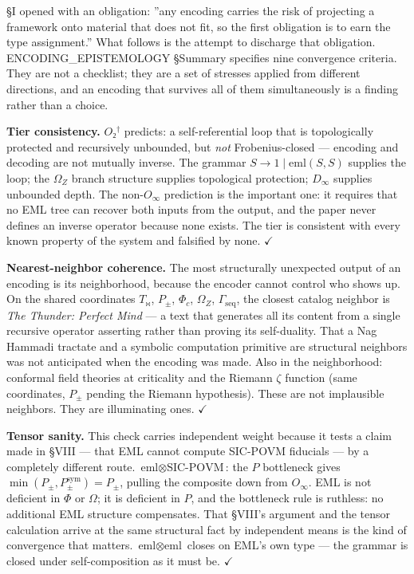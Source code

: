 \documentclass[12pt,a4paper]{article}
\newcommand{\pilcrow}{\S}
\begin{document}
\pilcrow{}I opened with an obligation: ''any encoding carries the risk of projecting a
framework onto material that does not fit, so the first obligation is to earn the
type assignment.'' What follows is the attempt to discharge that obligation.
ENCODING\_EPISTEMOLOGY \pilcrow{}Summary specifies nine convergence criteria. They are not
a checklist; they are a set of stresses applied from different directions, and
an encoding that survives all of them simultaneously is a finding rather than a
choice.

\textbf{Tier consistency.} $O₂^\dagger$ predicts: a self-referential loop that is
topologically protected and recursively unbounded, but \emph{not} Frobenius-closed ---
encoding and decoding are not mutually inverse. The grammar $S \to 1 \mid
\text{eml}(S,S)$ supplies the loop; the $\Omega_Z$ branch structure supplies
topological protection; $D_{\infty}$ supplies unbounded depth. The non-$O_{\infty}$
prediction is the important one: it requires that no EML tree can recover both
inputs from the output, and the paper never defines an inverse operator because
none exists. The tier is consistent with every known property of the system and
falsified by none. $\checkmark$

\textbf{Nearest-neighbor coherence.} The most structurally unexpected output of an
encoding is its neighborhood, because the encoder cannot control who shows up.
On the shared coordinates $T_{\bowtie}$, $P_{\pm}$, $\Phi_c$, $\Omega_Z$,
$\Gamma_\text{seq}$, the closest catalog neighbor is \emph{The Thunder: Perfect Mind}
--- a text that generates all its content from a single recursive operator asserting
rather than proving its self-duality. That a Nag Hammadi tractate and a symbolic
computation primitive are structural neighbors was not anticipated when the
encoding was made. Also in the neighborhood: conformal field theories at
criticality and the Riemann $\zeta$ function (same coordinates, $P_{\pm}$ pending
the Riemann hypothesis). These are not implausible neighbors. They are
illuminating ones. $\checkmark$

\textbf{Tensor sanity.} This check carries independent weight because it tests a
claim made in \pilcrow{}VIII --- that EML cannot compute SIC-POVM fiducials --- by a
completely different route. $\text{eml} \otimes \text{SIC-POVM}$: the $P$
bottleneck gives $\min(P_{\pm}, P_{\pm}^{\text{sym}}) = P_{\pm}$, pulling the
composite down from $O_{\infty}$. EML is not deficient in $\Phi$ or $\Omega$;
it is deficient in $P$, and the bottleneck rule is ruthless: no additional EML
structure compensates. That \pilcrow{}VIII's argument and the tensor calculation arrive
at the same structural fact by independent means is the kind of convergence that
matters. $\text{eml} \otimes \text{eml}$ closes on EML's own type --- the grammar
is closed under self-composition as it must be. $\checkmark$
\end{document}

